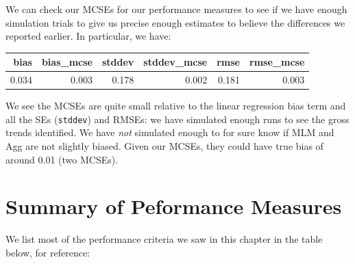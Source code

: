 \documentclass[
]{book}
\newenvironment{Shaded}{\begin{snugshade}}{\end{snugshade}}
\newcommand{\AttributeTok}[1]{\textcolor[rgb]{0.13,0.29,0.53}{#1}}
\newcommand{\DecValTok}[1]{\textcolor[rgb]{0.00,0.00,0.81}{#1}}
\newcommand{\FunctionTok}[1]{\textcolor[rgb]{0.13,0.29,0.53}{\textbf{#1}}}
\newcommand{\NormalTok}[1]{#1}
\newcommand{\OtherTok}[1]{\textcolor[rgb]{0.56,0.35,0.01}{#1}}
\newcommand{\SpecialCharTok}[1]{\textcolor[rgb]{0.81,0.36,0.00}{\textbf{#1}}}
\newcommand{\StringTok}[1]{\textcolor[rgb]{0.31,0.60,0.02}{#1}}
\begin{document}
We can check our MCSEs for our performance measures to see if we have enough simulation trials to give us precise enough estimates to believe the differences we reported earlier.
In particular, we have:

\begin{Shaded}
\end{Shaded}

\begin{tabular}{r|r|r|r|r|r}
\hline
bias & bias\_mcse & stddev & stddev\_mcse & rmse & rmse\_mcse\\
\hline
0.034 & 0.003 & 0.178 & 0.002 & 0.181 & 0.003\\
\hline
\end{tabular}

We see the MCSEs are quite small relative to the linear regression bias term and all the SEs (\texttt{stddev}) and RMSEs: we have simulated enough runs to see the gross trends identified.
We have \emph{not} simulated enough to for sure know if MLM and Agg are not slightly biased. Given our MCSEs, they could have true bias of around 0.01 (two MCSEs).

\section{Summary of Peformance Measures}\label{summary-of-peformance-measures}

We list most of the performance criteria we saw in this chapter in the table below, for reference:
\end{document}
